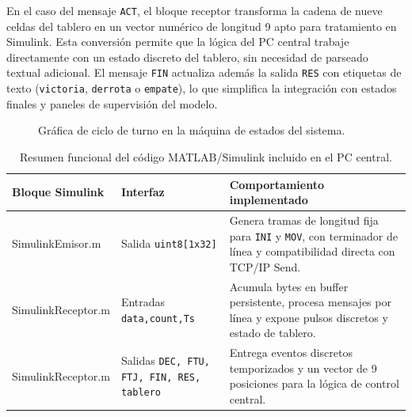 \documentclass[12pt,a4paper]{article}
\begin{document}
En el caso del mensaje \texttt{ACT}, el bloque receptor transforma la cadena de nueve celdas del tablero en un vector num\'erico de longitud 9 apto para tratamiento en Simulink. Esta conversi\'on permite que la l\'ogica del PC central trabaje directamente con un estado discreto del tablero, sin necesidad de parseado textual adicional. El mensaje \texttt{FIN} actualiza adem\'as la salida \texttt{RES} con etiquetas de texto (\texttt{victoria}, \texttt{derrota} o \texttt{empate}), lo que simplifica la integraci\'on con estados finales y paneles de supervisi\'on del modelo.

\begin{figure}[h]
\centering
{}
\caption{Gr\'afica de ciclo de turno en la m\'aquina de estados del sistema.}
\end{figure}

\begin{table}[H]
\centering
\footnotesize
\begin{tabular}{P{0.24\textwidth} P{0.18\textwidth} P{0.48\textwidth}}
\toprule
\textbf{Bloque Simulink} & \textbf{Interfaz} & \textbf{Comportamiento implementado} \\
\midrule
SimulinkEmisor.m & Salida \texttt{uint8[1x32]} & Genera tramas de longitud fija para \texttt{INI} y \texttt{MOV}, con terminador de l\'inea y compatibilidad directa con TCP/IP Send. \\
SimulinkReceptor.m & Entradas \texttt{data,count,Ts} & Acumula bytes en buffer persistente, procesa mensajes por l\'inea y expone pulsos discretos y estado de tablero. \\
SimulinkReceptor.m & Salidas \texttt{DEC, FTU, FTJ, FIN, RES, tablero} & Entrega eventos discretos temporizados y un vector de 9 posiciones para la l\'ogica de control central. \\
\bottomrule
\end{tabular}
\caption{Resumen funcional del c\'odigo MATLAB/Simulink incluido en el PC central.}
\end{table}
\end{document}
